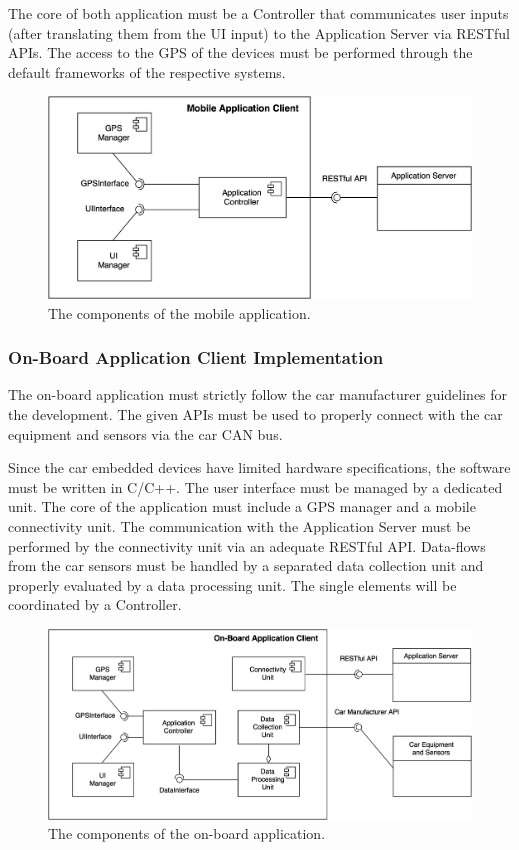 The core of both application must be a Controller that communicates user inputs (after translating them from the UI input) to the Application Server via RESTful APIs. The access to the GPS of the devices must be performed through the default frameworks of the respective systems.

\begin{figure}[H]
\begin{center}
		\includegraphics[width=\textwidth]{./arch_design/diagrams/mobile_app_comps.png}
		\caption{The components of the mobile application.}
		\label{mobile_app_comps}
\end{center}
\end{figure}

\subsubsection{On-Board Application Client Implementation}
The on-board application must strictly follow the car manufacturer guidelines for the development. The given APIs must be used to properly connect with the car equipment and sensors via the car CAN bus.

Since the car embedded devices have limited hardware specifications, the software must be written in C/C++. The user interface must be managed by a dedicated unit. The core of the application must include a GPS manager and a mobile connectivity unit. The communication with the Application Server must be performed by the connectivity unit via an adequate RESTful API. Data-flows from the car sensors must be handled by a separated data collection unit and properly evaluated by a data processing unit. The single elements will be coordinated by a Controller.

\begin{figure}[H]
\begin{center}
		\includegraphics[width=\textwidth]{./arch_design/diagrams/on_board_comps.png}
		\caption{The components of the on-board application.}
		\label{on_board_comps}
\end{center}
\end{figure}

